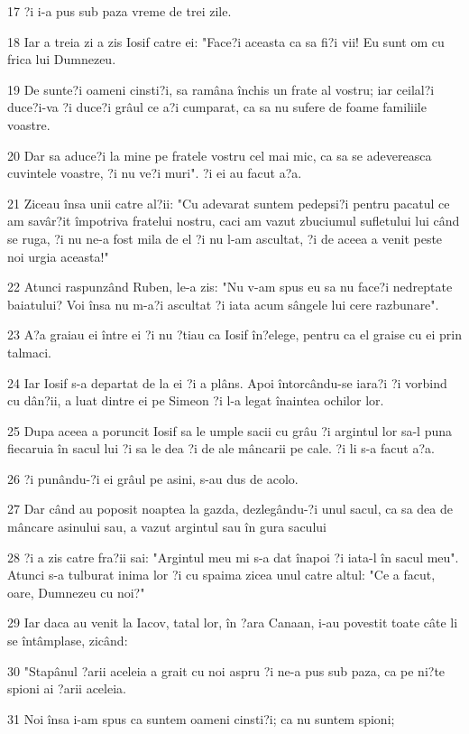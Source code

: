 \par 17 ?i i-a pus sub paza vreme de trei zile.
\par 18 Iar a treia zi a zis Iosif catre ei: "Face?i aceasta ca sa fi?i vii! Eu sunt om cu frica lui Dumnezeu.
\par 19 De sunte?i oameni cinsti?i, sa ramâna închis un frate al vostru; iar ceilal?i duce?i-va ?i duce?i grâul ce a?i cumparat, ca sa nu sufere de foame familiile voastre.
\par 20 Dar sa aduce?i la mine pe fratele vostru cel mai mic, ca sa se adevereasca cuvintele voastre, ?i nu ve?i muri". ?i ei au facut a?a.
\par 21 Ziceau însa unii catre al?ii: "Cu adevarat suntem pedepsi?i pentru pacatul ce am savâr?it împotriva fratelui nostru, caci am vazut zbuciumul sufletului lui când se ruga, ?i nu ne-a fost mila de el ?i nu l-am ascultat, ?i de aceea a venit peste noi urgia aceasta!"
\par 22 Atunci raspunzând Ruben, le-a zis: "Nu v-am spus eu sa nu face?i nedreptate baiatului? Voi însa nu m-a?i ascultat ?i iata acum sângele lui cere razbunare".
\par 23 A?a graiau ei între ei ?i nu ?tiau ca Iosif în?elege, pentru ca el graise cu ei prin talmaci.
\par 24 Iar Iosif s-a departat de la ei ?i a plâns. Apoi întorcându-se iara?i ?i vorbind cu dân?ii, a luat dintre ei pe Simeon ?i l-a legat înaintea ochilor lor.
\par 25 Dupa aceea a poruncit Iosif sa le umple sacii cu grâu ?i argintul lor sa-l puna fiecaruia în sacul lui ?i sa le dea ?i de ale mâncarii pe cale. ?i li s-a facut a?a.
\par 26 ?i punându-?i ei grâul pe asini, s-au dus de acolo.
\par 27 Dar când au poposit noaptea la gazda, dezlegându-?i unul sacul, ca sa dea de mâncare asinului sau, a vazut argintul sau în gura sacului
\par 28 ?i a zis catre fra?ii sai: "Argintul meu mi s-a dat înapoi ?i iata-l în sacul meu". Atunci s-a tulburat inima lor ?i cu spaima zicea unul catre altul: "Ce a facut, oare, Dumnezeu cu noi?"
\par 29 Iar daca au venit la Iacov, tatal lor, în ?ara Canaan, i-au povestit toate câte li se întâmplase, zicând:
\par 30 "Stapânul ?arii aceleia a grait cu noi aspru ?i ne-a pus sub paza, ca pe ni?te spioni ai ?arii aceleia.
\par 31 Noi însa i-am spus ca suntem oameni cinsti?i; ca nu suntem spioni;
